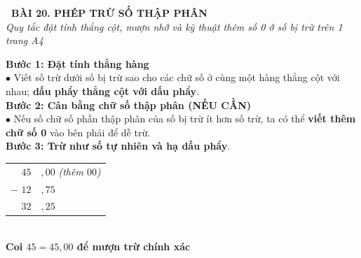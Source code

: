 \documentclass[14pt,a4paper,oneside]{extbook}
\begin{document}
\noindent
\begin{tcolorbox}[
  enhanced,
  colback=teal!8!white,
  colframe=teal!80!black,
  arc=3mm,
  boxrule=1.1pt,
  width=\linewidth,
  halign=center,
  top=2.2mm, bottom=2.2mm,
  left=3mm, right=3mm,
  drop fuzzy shadow
]
  {\large\bfseries\color{teal!95!black}\faBookmark\ BÀI 20. PHÉP TRỪ SỐ THẬP PHÂN}\\[2pt]
  {\scriptsize\color{black!75}\itshape Quy tắc đặt tính thẳng cột, mượn nhớ và kỹ thuật thêm số 0 ở số bị trừ trên 1 trang A4}
\end{tcolorbox}

\vspace{3.2mm}
\noindent
\begin{minipage}[t]{0.58\textwidth}
  \begin{tcolorbox}[
    enhanced,
    title={\footnotesize\bfseries\color{white}\faKey\ 1. Quy tắc trừ hai số thập phân},
    colback=blue!2!white,
    colframe=blue!75!black,
    arc=2.5mm, boxrule=0.8pt, top=1.8mm, bottom=1.8mm, left=2.2mm, right=2.2mm
  ]
    \footnotesize
    \textbf{Bước 1: Đặt tính thẳng hàng}\\
    $\bullet$ Viết số trừ dưới số bị trừ sao cho các chữ số ở cùng một hàng thẳng cột với nhau; \textbf{dấu phẩy thẳng cột với dấu phẩy}.\\[2pt]
    \textbf{Bước 2: Cân bằng chữ số thập phân (NẾU CẦN)}\\
    $\bullet$ Nếu số chữ số phần thập phân của số bị trừ ít hơn số trừ, ta có thể \textbf{viết thêm chữ số 0} vào bên phải để dễ trừ.\\[2pt]
    \textbf{Bước 3: Trừ như số tự nhiên và hạ dấu phẩy}.
  \end{tcolorbox}
\end{minipage}%
\hfill
\begin{minipage}[t]{0.40\textwidth}
  \begin{tcolorbox}[
    enhanced,
    title={\footnotesize\bfseries\color{white}\faPencil\ Minh họa thêm số 0},
    colback=teal!2!white,
    colframe=teal!75!black,
    arc=2.5mm, boxrule=0.8pt, top=1.8mm, bottom=1.8mm, left=1.5mm, right=1.5mm,
    halign=center
  ]
    \small
    \begin{tabular}{r@{\,}l}
      $45$&${,}00$ \quad \textit{(thêm $00$)} \\
      $-$ \quad $12$&${,}75$ \\ \hline
      $32$&${,}25$
    \end{tabular}\\[3pt]
    {\tiny\color{teal!95!black}\bfseries Coi $45 = 45,00$ để mượn trừ chính xác}
  \end{tcolorbox}
\end{minipage}
\end{document}
